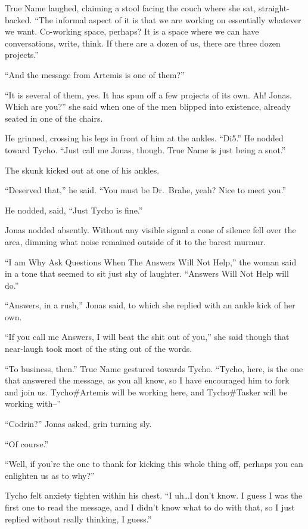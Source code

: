 True Name laughed, claiming a stool facing the couch where she sat, straight-backed. ``The informal aspect of it is that we are working on essentially whatever we want. Co-working space, perhaps? It is a space where we can have conversations, write, think. If there are a dozen of us, there are three dozen projects.''

``And the message from Artemis is one of them?''

``It is several of them, yes. It has spun off a few projects of its own. Ah! Jonas. Which are you?'' she said when one of the men blipped into existence, already seated in one of the chairs.

He grinned, crossing his legs in front of him at the ankles. ``Di5.'' He nodded toward Tycho. ``Just call me Jonas, though. True Name is just being a snot.''

The skunk kicked out at one of his ankles.

``Deserved that,'' he said. ``You must be Dr.~Brahe, yeah? Nice to meet you.''

He nodded, said, ``Just Tycho is fine.''

Jonas nodded absently. Without any visible signal a cone of silence fell over the area, dimming what noise remained outside of it to the barest murmur.

``I am Why Ask Questions When The Answers Will Not Help,'' the woman said in a tone that seemed to sit just shy of laughter. ``Answers Will Not Help will do.''

``Answers, in a rush,'' Jonas said, to which she replied with an ankle kick of her own.

``If you call me Answers, I will beat the shit out of you,'' she said though that near-laugh took most of the sting out of the words.

``To business, then.'' True Name gestured towards Tycho. ``Tycho, here, is the one that answered the message, as you all know, so I have encouraged him to fork and join us. Tycho\#Artemis will be working here, and Tycho\#Tasker will be working with--''

``Codrin?'' Jonas asked, grin turning sly.

``Of course.''

``Well, if you're the one to thank for kicking this whole thing off, perhaps you can enlighten us as to why?''

Tycho felt anxiety tighten within his chest. ``I uh\ldots I don't know. I guess I was the first one to read the message, and I didn't know what to do with that, so I just replied without really thinking, I guess.''

